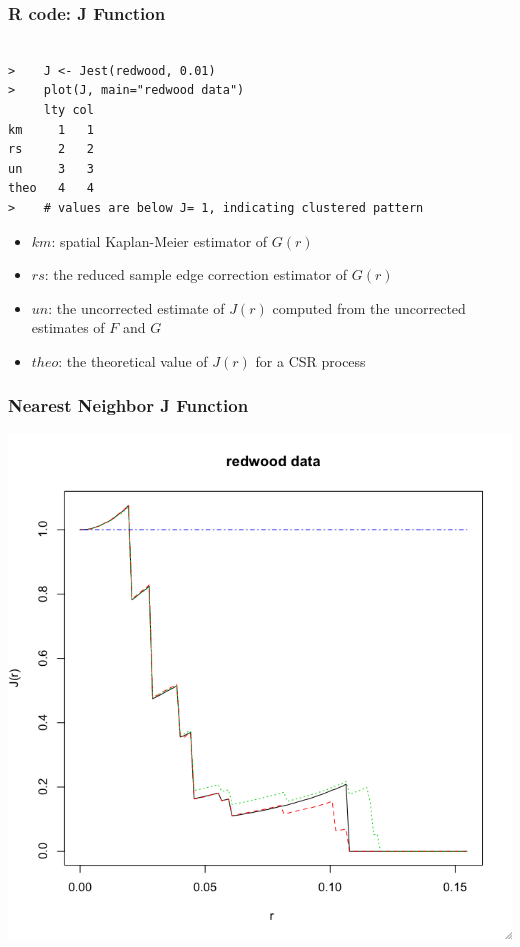 \documentclass[nototal,handout]{beamer}
\begin{document}
  \begin{frame}[containsverbatim]
    \frametitle{R code: J Function}
    \begin{small}
      \begin{verbatim}

>    J <- Jest(redwood, 0.01)
>    plot(J, main="redwood data")
     lty col
km     1   1
rs     2   2
un     3   3
theo   4   4
>    # values are below J= 1, indicating clustered pattern
      \end{verbatim}
      \begin{itemize}
	\item $km$: spatial Kaplan-Meier estimator of $G(r)$
	\item $rs$: the reduced sample edge correction estimator of $G(r)$
	\item $un$: the uncorrected estimate of $J(r)$ computed from the
	  uncorrected estimates of $F$ and $G$
	\item $theo$: the theoretical value of $J(r)$ for a CSR process
      \end{itemize}
    \end{small}
   \end{frame}



\begin{frame}[<+->]
    \frametitle{Nearest Neighbor J Function}
    \begin{center}
      \includegraphics[width=.65\linewidth]{jredwood.png}
    \end{center}
  \end{frame}
\end{document}
